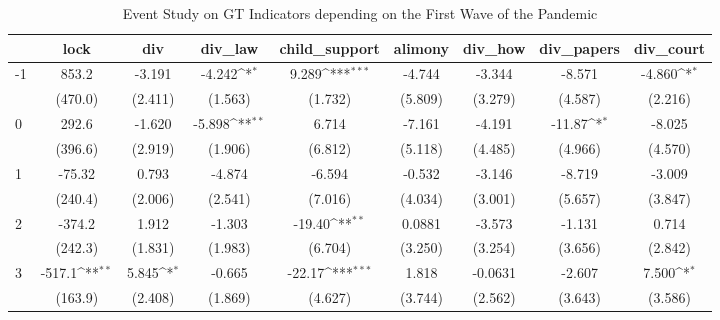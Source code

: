 \documentclass{article}
\begin{document}
{
\def\sym#1{\ifmmode^{#1}\else\(^{#1}\)\fi}
\begin{longtable}{l*{8}{c}}
\caption{Event Study on GT Indicators depending on the First Wave of the Pandemic}\\
\hline\hline\endfirsthead\hline\endhead\hline\endfoot\endlastfoot
                &\multicolumn{1}{c}{lock}&\multicolumn{1}{c}{div}&\multicolumn{1}{c}{div\_law}&\multicolumn{1}{c}{child\_support}&\multicolumn{1}{c}{alimony}&\multicolumn{1}{c}{div\_how}&\multicolumn{1}{c}{div\_papers}&\multicolumn{1}{c}{div\_court}\\
\hline
-1              &    853.2         &   -3.191         &   -4.242\sym{*}  &    9.289\sym{***}&   -4.744         &   -3.344         &   -8.571         &   -4.860\sym{*}  \\
                &  (470.0)         &  (2.411)         &  (1.563)         &  (1.732)         &  (5.809)         &  (3.279)         &  (4.587)         &  (2.216)         \\
0               &    292.6         &   -1.620         &   -5.898\sym{**} &    6.714         &   -7.161         &   -4.191         &   -11.87\sym{*}  &   -8.025         \\
                &  (396.6)         &  (2.919)         &  (1.906)         &  (6.812)         &  (5.118)         &  (4.485)         &  (4.966)         &  (4.570)         \\
1               &   -75.32         &    0.793         &   -4.874         &   -6.594         &   -0.532         &   -3.146         &   -8.719         &   -3.009         \\
                &  (240.4)         &  (2.006)         &  (2.541)         &  (7.016)         &  (4.034)         &  (3.001)         &  (5.657)         &  (3.847)         \\
2               &   -374.2         &    1.912         &   -1.303         &   -19.40\sym{**} &   0.0881         &   -3.573         &   -1.131         &    0.714         \\
                &  (242.3)         &  (1.831)         &  (1.983)         &  (6.704)         &  (3.250)         &  (3.254)         &  (3.656)         &  (2.842)         \\
3               &   -517.1\sym{**} &    5.845\sym{*}  &   -0.665         &   -22.17\sym{***}&    1.818         &  -0.0631         &   -2.607         &    7.500\sym{*}  \\
                &  (163.9)         &  (2.408)         &  (1.869)         &  (4.627)         &  (3.744)         &  (2.562)         &  (3.643)         &  (3.586)         \\

\end{longtable}}
\end{document}
